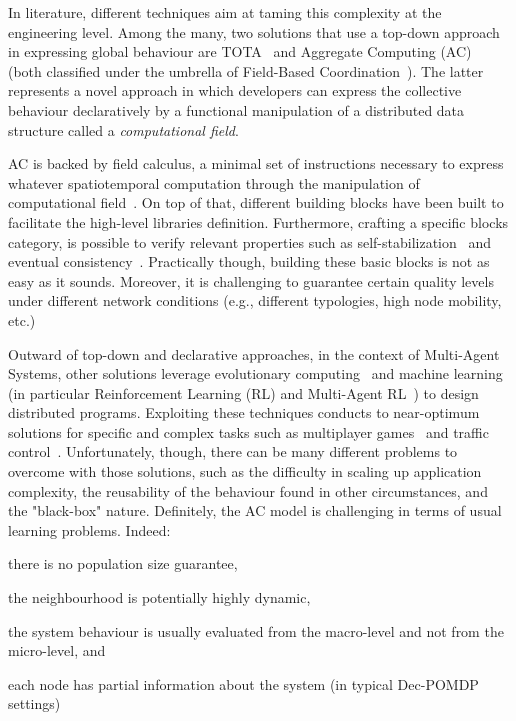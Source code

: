 \documentclass[conference]{IEEEtran}
\begin{document}
In literature, different techniques aim at taming this complexity at the engineering level.
Among the many, two solutions that use a top-down approach in expressing global behaviour are TOTA~\cite{DBLP:journals/tosem/MameiZ09} and Aggregate Computing (AC)~\cite{DBLP:journals/computer/BealPV15} (both classified under the umbrella of Field-Based Coordination~\cite{DBLP:books/daglib/0015276}).
The latter represents a novel approach in which developers can express the collective behaviour declaratively by
a functional manipulation of a distributed data structure called a \emph{computational field}.

AC is backed by field calculus, a minimal set of instructions necessary to express whatever spatiotemporal computation 
through the manipulation of computational field~\cite{DBLP:conf/coordination/AudritoBDV18}. 
On top of that, different building blocks have been built to facilitate the high-level libraries definition.
Furthermore, crafting a specific blocks category, is possible to verify relevant properties such as self-stabilization~\cite{DBLP:conf/coordination/ViroliD14} and eventual consistency~\cite{DBLP:conf/saso/BealVPD16}.
Practically though, building these basic blocks is not as easy as it sounds. 
Moreover, it is challenging to guarantee certain quality levels under different network conditions (e.g., different typologies, high node mobility, etc.)

Outward of top-down and declarative approaches, in the context of Multi-Agent Systems, other solutions leverage evolutionary computing~\cite{DBLP:journals/swarm/BrambillaFBD13} and machine learning (in particular Reinforcement Learning (RL) and Multi-Agent RL~\cite{DBLP:journals/tcyb/NguyenNN20}) to design distributed programs.
Exploiting these techniques conducts to near-optimum solutions for specific and complex tasks such as multiplayer games~\cite{DBLP:journals/nature/VinyalsBCMDCCPE19} and traffic control~\cite{DBLP:journals/aes/JinMK17}.
Unfortunately, though, there can be many different problems to overcome with those solutions, such as
the difficulty in scaling up application complexity, the reusability of the behaviour found in other circumstances, and the "black-box" nature. 
%
Definitely, the AC model is challenging in terms of usual learning problems. Indeed:
\begin{enumerate*}[label=(\roman*)]
\item there is no population size guarantee,
\item the neighbourhood is potentially highly dynamic,
\item the system behaviour is usually evaluated from the macro-level and not from the micro-level, and
\item each node has partial information about the system (in typical Dec-POMDP~\cite{DBLP:conf/uai/BernsteinZI00} settings)
\end{enumerate*}
\end{document}
